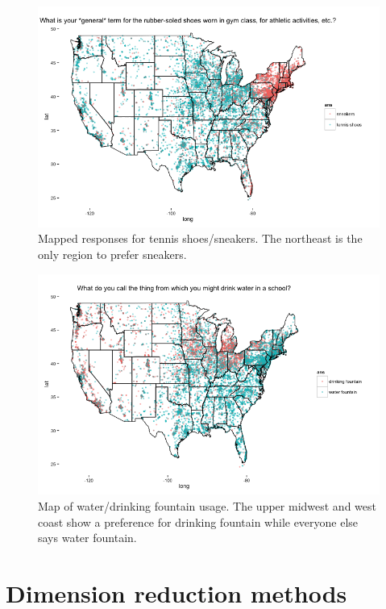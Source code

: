 \documentclass[english]{article}\usepackage{graphicx, color}
\numberwithin{equation}{section}
\numberwithin{figure}{section}
\begin{document}
\begin{figure}
\begin{center}
\includegraphics[scale = .5]{Rplot2.png}
\end{center}
\caption{Mapped responses for tennis shoes/sneakers. The northeast is the only region to prefer sneakers.}
\end{figure}

\begin{figure}
\begin{center}
\includegraphics[scale = .5]{Rplot3.png}
\end{center}
\caption{Map of water/drinking fountain usage. The upper midwest and west coast show a preference for drinking fountain while everyone else says water fountain.}
\end{figure}


\section{Dimension reduction methods}
\end{document}
